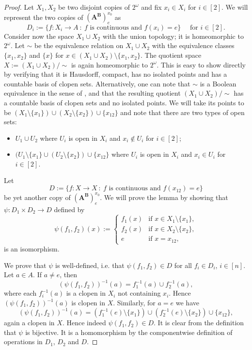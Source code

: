 \documentclass[12pt,a4paper,reqno]{amsart}
\numberwithin{equation}{section}
\theoremstyle{plain}
\theoremstyle{definition}
\newcommand{\AB}{\mathbf{A^B}}
\newcommand{\st}{\: :\:}
\begin{document}
\begin{proof}
Let $X_1,X_2$ be two disjoint copies of $2^\omega$ and fix $x_i\in X_i$ for $i\in [2]$.
 We will represent the two copies of $(\AB)^{x_0}_{e}$ as
\[
 D_i:= \{ f\colon X_i\rightarrow A \st f\text{ is continuous and } f(x_i)=e\} \quad \text{ for } i\in [2].
\]
Consider now the space $X_1\cup X_2$ with the union topology; it is homeomorphic to $2^\omega$.
Let $\sim$ be the equivalence relation on $X_1\cup X_2$ with the equivalence classes
$\{ x_1,x_2\}$ and $\{x\}$ for $x\in (X_1\cup X_2)\setminus \{x_1,x_2\}$.
The quotient space $X :=(X_1\cup X_2)/{\sim}$ is again homeomorphic to $2^\omega$.
This is easy to show directly by verifying that it is Hausdorff, compact, has no isolated points and has a countable basis
of clopen sets. Alternatively, one can note that $\sim$ is a Boolean equivalence in the sense of \cite{Mo:HBA1},
and that the resulting quotient $(X_1\cup X_2)/\!\sim$ has a countable basis of clopen sets and no isolated points.
 We will take its points to be $(X_1\setminus\{x_1\})\cup (X_2\setminus\{x_2\})\cup \{x_{12}\}$ and note that there are
 two types of open sets:
\begin{itemize}
\item
$U_1\cup U_2$ where $ U_i$ is open in  $X_i$ and  $x_i\not\in U_i$  for  $i\in[2]$;
\item
$(U_1\setminus\{x_1\} \cup (U_2\setminus\{ x_2\})\cup\{x_{12}\}$ where $U_i$  is open in $X_i$ and $x_i\in U_i$ for $i\in[2]$.
\end{itemize}
Let
\[
D:=\{ f \colon X\rightarrow X \st f\text{ is continuous and } f(x_{12})=e\}
\]
be yet another copy of $(\AB)^{x_0}_{e}$. We will prove the lemma by showing that
$\psi\colon D_1\times D_2\rightarrow D$  defined by
\[
\psi(f_1,f_2)(x):=\begin{cases} f_1(x) & \text{if } x\in X_1\setminus\{x_1\},\\
f_2(x) & \text{if } x\in X_2\setminus\{x_2\},\\
e & \text{if } x=x_{12},\end{cases}
\]
is an isomorphism.

We prove that $\psi$ is well-defined, i.e. that $\psi(f_1,f_2)\in D$ for all $f_i\in D_i$, $i\in [n]$.
Let $a\in A$.
If $a\neq e$, then 
\[
(\psi(f_1,f_2))^{-1}(a)=f_1^{-1}(a)\cup f_2^{-1}(a),
\]
where each $f_i^{-1}(a)$ is a clopen in $X_i$ not containing $x_i$.
Hence $(\psi(f_1,f_2))^{-1}(a)$ is clopen in $X$.
Similarly, for $a=e$ we have 
\[
(\psi(f_1,f_2))^{-1}(a)=(f_1^{-1}(e)\setminus\{x_1\})\cup (f_2^{-1}(e)\setminus \{x_2\})\cup \{x_{12}\},
\]
again a clopen in $X$.
Hence indeed $\psi(f_1,f_2)\in D$.
It is clear from the definition that $\psi$ is bijective. It is a homomorphism by the componentwise definition of
operations in $D_1$, $D_2$ and $D$.
\end{proof}  
\end{document}
